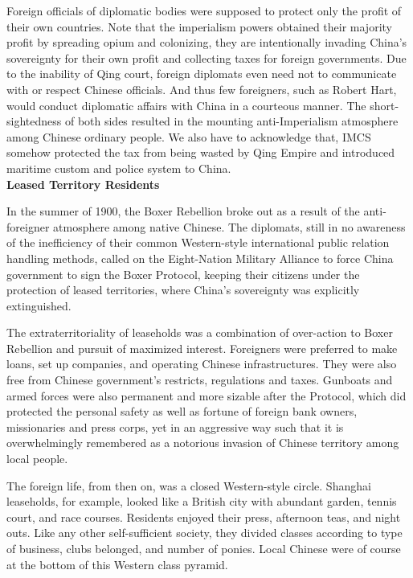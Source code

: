 \documentclass[11pt]{article}
\begin{document}
\begin{spacing}{2.0}
Foreign officials of diplomatic bodies were supposed to protect only the profit of their own countries. Note that the imperialism powers obtained their majority profit by spreading opium and colonizing, they are intentionally invading China's sovereignty for their own profit and collecting taxes for foreign governments. Due to the inability of Qing court, foreign diplomats even need not to communicate with or respect Chinese officials. And thus few foreigners, such as Robert Hart, would conduct diplomatic affairs with China in a courteous manner. The short-sightedness of both sides resulted in the mounting anti-Imperialism atmosphere among Chinese ordinary people. We also have to acknowledge that, IMCS somehow protected the tax from being wasted by Qing Empire and introduced maritime custom and police system to China.
\\
\textbf{Leased Territory Residents}

In the summer of 1900, the Boxer Rebellion broke out as a result of the anti-foreigner atmosphere among native Chinese. The diplomats, still in no awareness of the inefficiency of their common Western-style international public relation handling methods, called on the Eight-Nation Military Alliance to force China government to sign the Boxer Protocol, keeping their citizens under the protection of leased territories, where China's sovereignty was explicitly extinguished. 

The extraterritoriality of leaseholds was a combination of over-action to Boxer Rebellion and pursuit of maximized interest. Foreigners were preferred to make loans, set up companies, and operating Chinese infrastructures. They were also free from Chinese government's restricts, regulations and taxes. Gunboats and armed forces were also permanent and more sizable after the Protocol, which did protected the personal safety as well as fortune of foreign bank owners, missionaries and press corps, yet in an aggressive way such that it is overwhelmingly remembered as a notorious invasion of Chinese territory among local people.

The foreign life, from then on, was a closed Western-style circle. Shanghai leaseholds, for example, looked like a British city with abundant garden, tennis court, and race courses. Residents enjoyed their press, afternoon teas, and night outs. Like any other self-sufficient society, they divided classes according to type of business, clubs belonged, and number of ponies. Local Chinese were of course at the bottom of this Western class pyramid.


\end{spacing}
\end{document}
